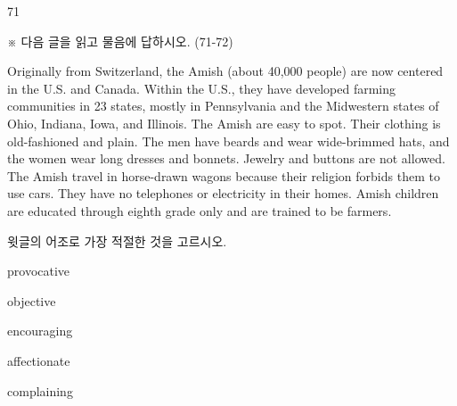 \begin{question}{71}
\begin{framedtext}
※ 다음 글을 읽고 물음에 답하시오. (71-72) \par
Originally from Switzerland, the Amish (about 40,000 people) are now centered in the U.S. and Canada. Within the U.S., they have developed farming communities in 23 states, mostly in Pennsylvania and the Midwestern states of Ohio, Indiana, Iowa, and Illinois. The Amish are easy to spot. Their clothing is old-fashioned and plain. The men have beards and wear wide-brimmed hats, and the women wear long dresses and bonnets. Jewelry and buttons are not allowed. The Amish travel in horse-drawn wagons because their religion forbids them to use cars. They have no telephones or electricity in their homes. Amish children are educated through eighth grade only and are trained to be farmers. \par
\end{framedtext}
윗글의 어조로 가장 적절한 것을 고르시오.
\begin{choices}
  \item provocative
  \item objective
  \item encouraging
  \item affectionate
  \item complaining
\end{choices}
\end{question}
